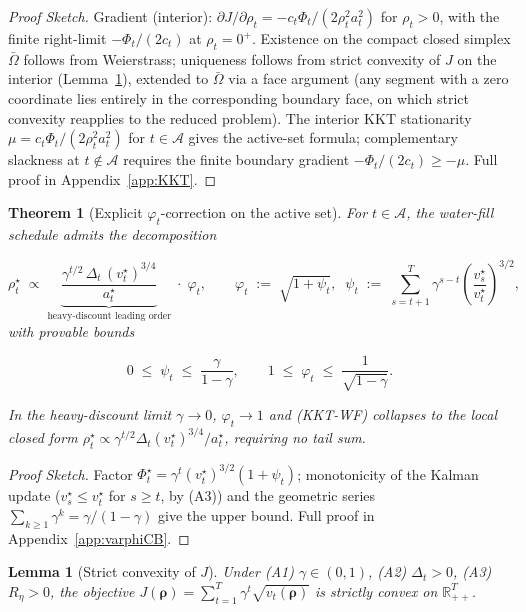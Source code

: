 \documentclass{article}
\newtheorem{theorem}{Theorem}
\newtheorem{lemma}{Lemma}
\begin{document}
\begin{proof}[Proof Sketch]
     Gradient (interior): $\partial J/\partial \rho_t = -c_t \Phi_t/(2 \rho_t^2 a_t^2)$ for $\rho_t > 0$, with the finite right-limit $-\Phi_t/(2c_t)$ at $\rho_t = 0^+$. Existence on the compact closed simplex $\bar\Omega$ follows from Weierstrass; uniqueness follows from strict convexity of $J$ on the interior (Lemma~\ref{lem:strict_convexity}), extended to $\bar\Omega$ via a face argument (any segment with a zero coordinate lies entirely in the corresponding boundary face, on which strict convexity reapplies to the reduced problem). The interior KKT stationarity $\mu = c_t\Phi_t/(2\rho_t^2 a_t^2)$ for $t \in \mathcal{A}$ gives the active-set formula; complementary slackness at $t \notin \mathcal{A}$ requires the finite boundary gradient $-\Phi_t/(2c_t) \ge -\mu$. Full proof in Appendix~\ref{app:KKT}.
\end{proof}

\begin{theorem}[Explicit $\varphi_t$-correction on the active set]
\label{thm:varphiCB}
    For $t \in \mathcal{A}$, the water-fill schedule admits the decomposition

    $$\rho_t^\star \;\propto\; \underbrace{\frac{\gamma^{t/2}\, \Delta_t\, (v_t^\star)^{3/4}}{a_t^\star}}_{\text{heavy-discount leading order}} \;\cdot\; \varphi_t, \qquad \varphi_t \;:=\; \sqrt{1 + \psi_t}, \;\; \psi_t \;:=\; \sum_{s=t+1}^T \gamma^{s-t}\!\left(\frac{v_s^\star}{v_t^\star}\right)^{3/2},$$
    with provable bounds
    
    $$0 \;\le\; \psi_t \;\le\; \frac{\gamma}{1-\gamma}, \qquad 1 \;\le\; \varphi_t \;\le\; \frac{1}{\sqrt{1-\gamma}}.$$
    
    In the heavy-discount limit $\gamma \to 0$, $\varphi_t \to 1$ and (KKT-WF) collapses to the local closed form $\rho_t^\star \propto \gamma^{t/2} \Delta_t (v_t^\star)^{3/4}/a_t^\star$, requiring no tail sum.
\end{theorem}

\begin{proof}[Proof Sketch]
    Factor $\Phi_t^\star = \gamma^t (v_t^\star)^{3/2}(1 + \psi_t)$; monotonicity of the Kalman update ($v_s^\star \le v_t^\star$ for $s \ge t$, by (A3)) and the geometric series $\sum_{k\ge 1}\gamma^k = \gamma/(1-\gamma)$ give the upper bound. Full proof in Appendix~\ref{app:varphiCB}.
\end{proof}

\begin{lemma}[Strict convexity of $J$]
\label{lem:strict_convexity}
    Under (A1) $\gamma \in (0,1)$, (A2) $\Delta_t > 0$, (A3) $R_\eta > 0$, the objective $J(\boldsymbol{\rho}) = \sum_{t=1}^T \gamma^t\sqrt{v_t(\boldsymbol{\rho})}$ is strictly convex on $\mathbb{R}_{++}^T$.
\end{lemma}
\end{document}
